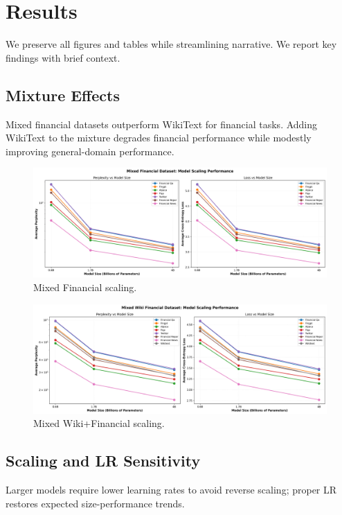 \chapter{Results}

We preserve all figures and tables while streamlining narrative. We report key findings with brief context.

\section{Mixture Effects}
Mixed financial datasets outperform WikiText for financial tasks. Adding WikiText to the mixture degrades financial performance while modestly improving general-domain performance.

\begin{figure}[H]
  \centering
  \includegraphics[width=\textwidth]{../thesis/figures/scaling_mixed_financial.png}
  \caption{Mixed Financial scaling.}\label{fig:scaling_mixed_financial}
\end{figure}

\begin{figure}[H]
  \centering
  \includegraphics[width=\textwidth]{../thesis/figures/scaling_mixed_wiki_financial.png}
  \caption{Mixed Wiki+Financial scaling.}\label{fig:scaling_mixed_wiki_financial}
\end{figure}

\section{Scaling and LR Sensitivity}
Larger models require lower learning rates to avoid reverse scaling; proper LR restores expected size-performance trends.

